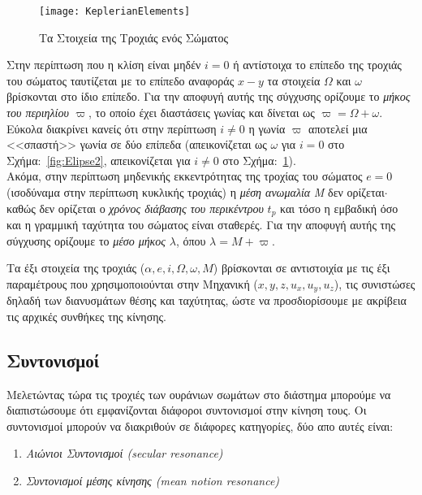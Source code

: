 \begin{figure}[h]
\en
  \centering
  \texttt{[image: KeplerianElements]}
  \gr
  \caption{Τα Στοιχεία της Τροχιάς ενός Σώματος}\label{fig:KeplerianElements}
\end{figure}

Στην περίπτωση που η κλίση είναι μηδέν $i=0$ ή αντίστοιχα το επίπεδο της τροχιάς του σώματος ταυτίζεται με το επίπεδο αναφοράς $x-y$ τα στοιχεία $\Omega$ και $ \omega$ βρίσκονται στο ίδιο επίπεδο. Για την αποφυγή αυτής της σύγχυσης ορίζουμε το {\it μήκος του περιηλίου} $\varpi$, το οποίο έχει διαστάσεις γωνίας και δίνεται ως $\varpi = \Omega+\omega$. Εύκολα διακρίνει κανείς ότι στην περίπτωση $ i \neq 0$  η γωνία $\varpi$ αποτελεί μια <<σπαστή>> γωνία σε δύο επίπεδα (απεικονίζεται ως $ω$ για $i=0$ στο Σχήμα:~\ref{fig:Elipse2}, απεικονίζεται για $ i\neq 0$ στο Σχήμα:~\ref{fig:KeplerianElements}).\\
Ακόμα, στην περίπτωση μηδενικής εκκεντρότητας της τροχίας του σώματος $ e=0$ (ισοδύναμα στην περίπτωση κυκλικής τροχιάς) η {\it μέση ανωμαλία} {\it Μ} δεν ορίζεται$\cdot$ καθώς δεν ορίζεται ο {\it χρόνος διάβασης του περικέντρου} $t_p$ και τόσο η εμβαδική όσο και η γραμμική ταχύτητα του σώματος είναι σταθερές. Για την αποφυγή αυτής της σύγχυσης ορίζουμε το {\it μέσο μήκος} $\lambda$, όπου $\lambda= Μ+\varpi$.

Τα έξι στοιχεία της τροχιάς ($ \alpha,e,i,\Omega,\omega,Μ$) βρίσκονται σε αντιστοιχία με τις έξι παραμέτρους που χρησιμοποιούνται στην Μηχανική ($x,y,z,u_x,u_y,u_z$), τις συνιστώσες δηλαδή των διανυσμάτων θέσης και ταχύτητας, ώστε να προσδιορίσουμε με ακρίβεια τις αρχικές συνθήκες της κίνησης.
 
\subsection{Συντονισμοί}

Μελετώντας τώρα τις τροχιές των ουράνιων σωμάτων στο διάστημα μπορούμε να διαπιστώσουμε ότι εμφανίζονται διάφοροι συντονισμοί στην κίνηση τους. Οι συντονισμοί μπορούν να διακριθούν σε διάφορες κατηγορίες, δύο απο αυτές είναι:

\begin{enumerate}

 \item {\it Αιώνιοι Συντονισμοί {\en (secular resonance)}}

 \item {\it Συντονισμοί μέσης κίνησης {\en (mean notion resonance)}}
 
\end{enumerate}

